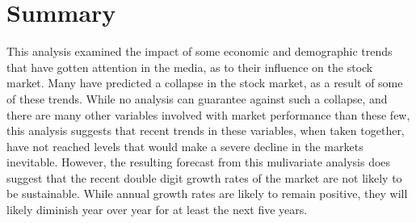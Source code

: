 \documentclass[12pt]{article}         %
\begin{document}
\section{Summary}

This analysis examined the impact of some economic and demographic trends that have gotten attention in the media, as to their influence on the stock market.  Many have predicted a collapse in the stock market, as a result of some of these trends.  While no analysis can guarantee against such a collapse, and there are many other variables involved with market performance than these few, this analysis suggests that recent trends in these variables, when taken together, have not reached levels that would make a severe decline in the markets inevitable.  However, the resulting forecast from this mulivariate analysis does suggest that the recent double digit growth rates of the market are not likely to be sustainable.  While annual growth rates are likely to remain positive, they will likely diminish year over year for at least the next five years.
\end{document}
